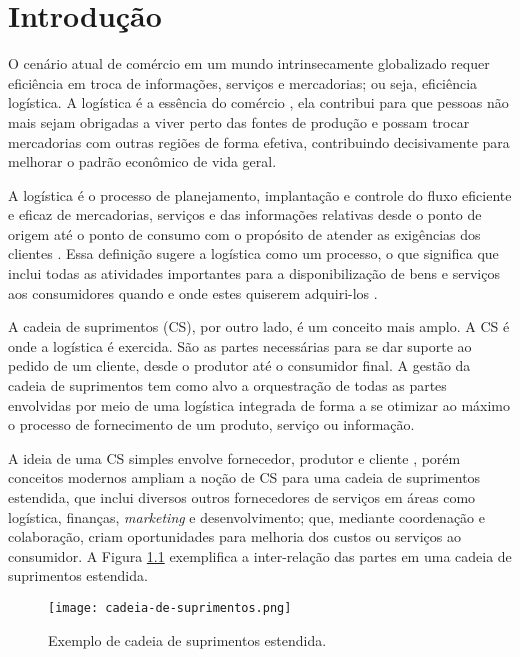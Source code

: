 \chapter{Introdução}

	O cenário atual de comércio em um mundo intrinsecamente globalizado requer eficiência em troca de informações, serviços e mercadorias; ou seja, eficiência logística. A logística é a essência do comércio \cite{ballou2006cadeiasuprimentos}, ela contribui para que pessoas não mais sejam obrigadas a viver perto das fontes de produção e possam trocar mercadorias com outras regiões de forma efetiva, contribuindo decisivamente para melhorar o padrão econômico de vida geral. 
	
	A logística é o processo de planejamento, implantação e controle do fluxo eficiente e eficaz de mercadorias, serviços e das informações relativas desde o ponto de origem até o ponto de consumo com o propósito de atender as exigências dos clientes \cite{cscmp2013supplychainglossary}. Essa definição sugere a logística como um processo, o que significa que inclui todas as atividades importantes para a disponibilização de bens e serviços aos consumidores quando e onde estes quiserem adquiri-los \cite{ballou2006cadeiasuprimentos}.
	
	A cadeia de suprimentos (CS), por outro lado, é um conceito mais amplo. A CS é onde a logística é exercida. São as partes necessárias para se dar suporte ao pedido de um cliente, desde o produtor até o consumidor final. A gestão da cadeia de suprimentos tem como alvo a orquestração de todas as partes envolvidas por meio de uma logística integrada de forma a se otimizar ao máximo o processo de fornecimento de um produto, serviço ou informação.
	
	A ideia de uma CS simples envolve fornecedor, produtor e cliente \cite{hugos2018supplychain}, porém conceitos modernos ampliam a noção de CS para uma cadeia de suprimentos estendida, que inclui diversos outros fornecedores de serviços em áreas como logística, finanças, \textit{marketing} e desenvolvimento; que, mediante coordenação e colaboração, criam oportunidades para melhoria dos custos ou serviços ao consumidor. A Figura \ref{fig:cadeia-de-suprimentos} exemplifica a inter-relação das partes em uma cadeia de suprimentos estendida.
	
	\begin{figure}[hbt!]
		\centering
		\caption{Exemplo de cadeia de suprimentos estendida.}
		\texttt{[image: cadeia-de-suprimentos.png]}
		\label{fig:cadeia-de-suprimentos}
	\end{figure}

